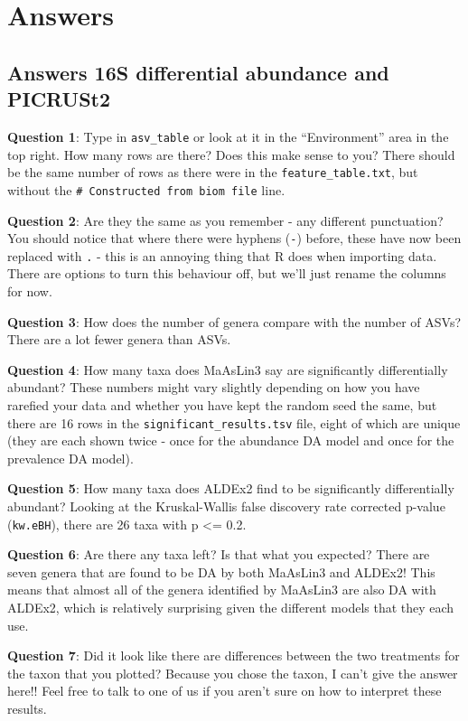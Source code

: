 \documentclass[
]{book}
\begin{document}
\section{Answers}\label{answers-2}

\subsection{Answers 16S differential abundance and PICRUSt2}\label{answers-16s-differential-abundance-and-picrust2}

\textbf{Question 1}: Type in \texttt{asv\_table} or look at it in the ``Environment'' area in the top right. How many rows are there? Does this make sense to you?
There should be the same number of rows as there were in the \texttt{feature\_table.txt}, but without the \texttt{\#\ Constructed\ from\ biom\ file} line.

\textbf{Question 2}: Are they the same as you remember - any different punctuation?
You should notice that where there were hyphens (\texttt{-}) before, these have now been replaced with \texttt{.} - this is an annoying thing that R does when importing data. There are options to turn this behaviour off, but we'll just rename the columns for now.

\textbf{Question 3}: How does the number of genera compare with the number of ASVs?
There are a lot fewer genera than ASVs.

\textbf{Question 4}: How many taxa does MaAsLin3 say are significantly differentially abundant?
These numbers might vary slightly depending on how you have rarefied your data and whether you have kept the random seed the same, but there are 16 rows in the \texttt{significant\_results.tsv} file, eight of which are unique (they are each shown twice - once for the abundance DA model and once for the prevalence DA model).

\textbf{Question 5}: How many taxa does ALDEx2 find to be significantly differentially abundant?
Looking at the Kruskal-Wallis false discovery rate corrected p-value (\texttt{kw.eBH}), there are 26 taxa with p \textless= 0.2.

\textbf{Question 6}: Are there any taxa left? Is that what you expected?
There are seven genera that are found to be DA by both MaAsLin3 and ALDEx2! This means that almost all of the genera identified by MaAsLin3 are also DA with ALDEx2, which is relatively surprising given the different models that they each use.

\textbf{Question 7}: Did it look like there are differences between the two treatments for the taxon that you plotted?
Because you chose the taxon, I can't give the answer here!! Feel free to talk to one of us if you aren't sure on how to interpret these results.
\end{document}
